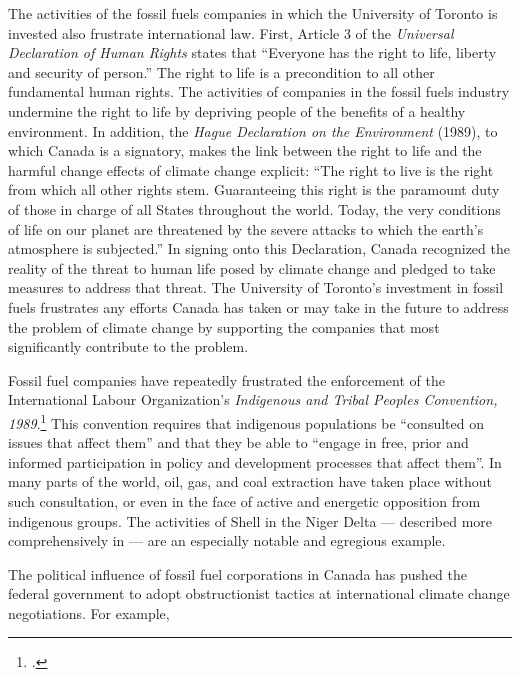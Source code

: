 The activities of the fossil fuels companies in which the University of Toronto is invested also frustrate international law.  
First, Article 3 of the \emph{Universal Declaration of Human Rights} states that ``Everyone has the right to life, liberty and security of person.''   
The right to life is a precondition to all other fundamental human rights.  
The activities of companies in the fossil fuels industry undermine the right to life by depriving people of the benefits of a healthy environment.  
In addition, the \emph{Hague Declaration on the Environment} (1989), to which Canada is a signatory, makes the link between the right to life and the harmful change effects of climate change explicit: ``The right to live is the right from which all other rights stem.  
Guaranteeing this right is the paramount duty of those in charge of all States throughout the world.  
Today, the very conditions of life on our planet are threatened by the severe attacks to which the earth’s atmosphere is subjected.''   
In signing onto this Declaration, Canada recognized the reality of the threat to human life posed by climate change and pledged to take measures to address that threat.  
The University of Toronto’s investment in fossil fuels frustrates any efforts Canada has taken or may take in the future to address the problem of climate change by supporting the companies that most significantly contribute to the problem.	







Fossil fuel companies have repeatedly frustrated the enforcement of the International Labour Organization's \emph{Indigenous and Tribal Peoples Convention, 1989}.\footcite[][]{ILOConv169}
This convention requires that indigenous populations be ``consulted on issues that affect them'' and that they be able to ``engage in free, prior and informed participation in policy and development processes that affect them''.
In many parts of the world, oil, gas, and coal extraction have taken place without such consultation, or even in the face of active and energetic opposition from indigenous groups.
The activities of Shell in the Niger Delta --- described more comprehensively in  --- are an especially notable and egregious example.



The political influence of fossil fuel corporations in Canada has pushed the federal government to adopt obstructionist tactics at international climate change negotiations.
For example,



